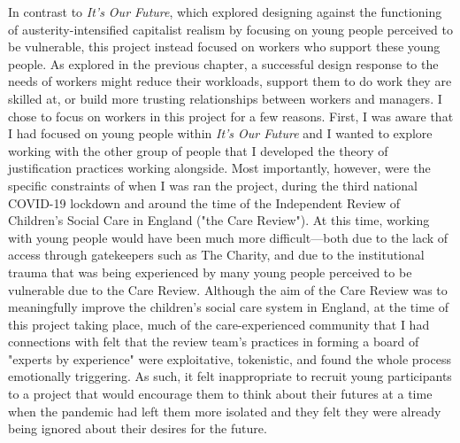 In contrast to \textit{It's Our Future}, which explored designing against the functioning of austerity-intensified capitalist realism by focusing on young people perceived to be vulnerable, this project instead focused on workers who support these young people. As explored in the previous chapter, a successful design response to the needs of workers might reduce their workloads, support them to do work they are skilled at, or build more trusting relationships between workers and managers. I chose to focus on workers in this project for a few reasons. First, I was aware that I had focused on young people within \textit{It's Our Future} and I wanted to explore working with the other group of people that I developed the theory of justification practices working alongside. Most importantly, however, were the specific constraints of when I was ran the project, during the third national COVID-19 lockdown and around the time of the Independent Review of Children's Social Care in England ("the Care Review"). At this time, working with young people would have been much more difficult—both due to the lack of access through gatekeepers such as The Charity, and due to the institutional trauma that was being experienced by many young people perceived to be vulnerable due to the Care Review. Although the aim of the Care Review was to meaningfully improve the children's social care system in England, at the time of this project taking place, much of the care-experienced community that I had connections with felt that the review team's practices in forming a board of "experts by experience" were exploitative, tokenistic, and found the whole process emotionally triggering. As such, it felt inappropriate to recruit young participants to a project that would encourage them to think about their futures at a time when the pandemic had left them more isolated and they felt they were already being ignored about their desires for the future. 

